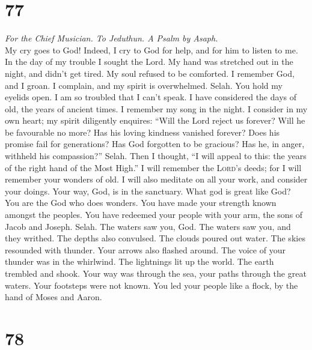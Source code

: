 \hypertarget{section-76}{%
\section{77}\label{section-76}}

\emph{For the Chief Musician. To Jeduthun. A Psalm by Asaph.}\\
 My cry goes to God! Indeed, I cry to God for help, and
for him to listen to me.  In the day of my trouble I
sought the Lord. My hand was stretched out in the night, and didn't get
tired. My soul refused to be comforted.  I remember God,
and I groan. I complain, and my spirit is overwhelmed. Selah.
 You hold my eyelids open. I am so troubled that I can't
speak.  I have considered the days of old, the years of
ancient times.  I remember my song in the night. I
consider in my own heart; my spirit diligently enquires: 
``Will the Lord reject us forever? Will he be favourable no more?
 Has his loving kindness vanished forever? Does his
promise fail for generations?  Has God forgotten to be
gracious? Has he, in anger, withheld his compassion?'' Selah.
 Then I thought, ``I will appeal to this: the years of
the right hand of the Most High.''  I will remember the
\textsc{Lord}'s deeds; for I will remember your wonders of old.
 I will also meditate on all your work, and consider your
doings.  Your way, God, is in the sanctuary. What god is
great like God?  You are the God who does wonders. You
have made your strength known amongst the peoples.  You
have redeemed your people with your arm, the sons of Jacob and Joseph.
Selah.  The waters saw you, God. The waters saw you, and
they writhed. The depths also convulsed.  The clouds
poured out water. The skies resounded with thunder. Your arrows also
flashed around.  The voice of your thunder was in the
whirlwind. The lightnings lit up the world. The earth trembled and
shook.  Your way was through the sea, your paths through
the great waters. Your footsteps were not known.  You led
your people like a flock, by the hand of Moses and Aaron.

\hypertarget{section-77}{%
\section{78}\label{section-77}}

